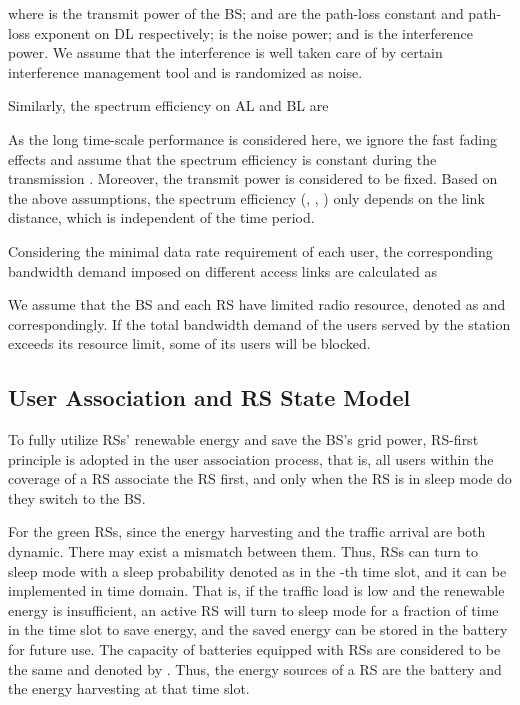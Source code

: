 \documentclass[conference]{IEEEtran}
\begin{document}
 where  is the transmit power of the BS;  and  are the path-loss constant and path-loss exponent on DL respectively;  is the noise power; and  is the interference power. We assume that the interference is well taken care of by certain interference management tool and is randomized as noise.

 Similarly, the spectrum efficiency on AL and BL are
 
 

 As the long time-scale performance is considered here, we ignore the fast fading effects and assume that the spectrum efficiency is constant during the transmission \cite{Jie2012Adynamic}. Moreover, the transmit power is considered to be fixed. Based on the above assumptions, the spectrum efficiency (, , ) only depends on the link distance, which is independent of the time period.

 Considering the minimal data rate requirement of each user, the corresponding bandwidth demand imposed on different access links are calculated as
 

 We assume that the BS and each RS have limited radio resource, denoted as  and  correspondingly. If the total bandwidth demand of the users served by the station exceeds its resource limit, some of its users will be blocked.

 \subsection{User Association and RS State Model}
 To fully utilize RSs' renewable energy and save the BS's grid power, RS-first principle is adopted in the user association process, that is, all users within the coverage of a RS associate the RS first, and only when the RS is in sleep mode do they switch to the BS.

 For the green RSs, since the energy harvesting and the traffic arrival are both dynamic. There may exist a mismatch between them. Thus, RSs can turn to sleep mode with a sleep probability denoted as  in the -th time slot, and it can be implemented in time domain. That is, if the traffic load is low and the renewable energy is insufficient, an active RS will turn to sleep mode for a fraction of time  in the time slot to save energy, and the saved energy can be stored in the battery for future use. The capacity of batteries equipped with RSs are considered to be the same and denoted by . Thus, the energy sources of a RS are the battery and the energy harvesting at that time slot.
\end{document}
